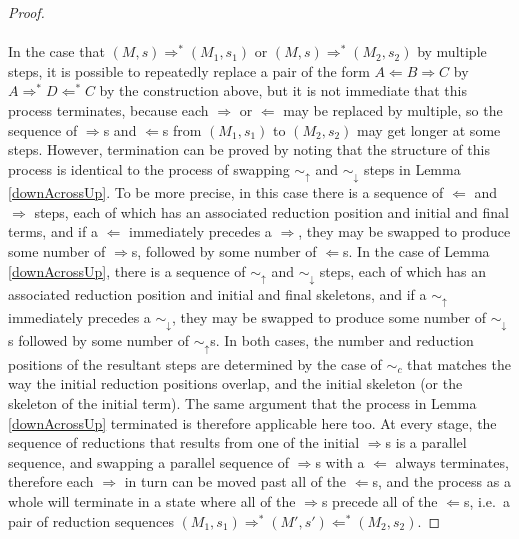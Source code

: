 \begin{proof}
\paragraph{}
In the case that $(M,s) \Rightarrow^* (M_1,s_1)$ or $(M,s) \Rightarrow^* (M_2,s_2)$ by multiple steps, it is possible to repeatedly replace a pair of the form $A \Leftarrow B \Rightarrow C$ by $A \Rightarrow^* D \Leftarrow^* C$ by the construction above, but it is not immediate that this process terminates, because each $\Rightarrow$ or $\Leftarrow$ may be replaced by multiple, so the sequence of $\Rightarrow$s and $\Leftarrow$s from $(M_1,s_1)$ to $(M_2,s_2)$ may get longer at some steps. However, termination can be proved by noting that the structure of this process is identical to the process of swapping $\sim_\uparrow$ and $\sim_\downarrow$ steps in Lemma \ref{downAcrossUp}. To be more precise, in this case there is a sequence of $\Leftarrow$ and $\Rightarrow$ steps, each of which has an associated reduction position and initial and final terms, and if a $\Leftarrow$ immediately precedes a $\Rightarrow$, they may be swapped to produce some number of $\Rightarrow$s, followed by some number of $\Leftarrow$s. In the case of Lemma \ref{downAcrossUp}, there is a sequence of $\sim_\uparrow$ and $\sim_\downarrow$ steps, each of which has an associated reduction position and initial and final skeletons, and if a $\sim_\uparrow$ immediately precedes a $\sim_\downarrow$, they may be swapped to produce some number of $\sim_\downarrow$s followed by some number of $\sim_\uparrow$s. In both cases, the number and reduction positions of the resultant steps are determined by the case of $\sim_c$ that matches the way the initial reduction positions overlap, and the initial skeleton (or the skeleton of the initial term). The same argument that the process in Lemma \ref{downAcrossUp} terminated is therefore applicable here too. At every stage, the sequence of reductions that results from one of the initial $\Rightarrow$s is a parallel sequence, and swapping a parallel sequence of $\Rightarrow$s with a $\Leftarrow$ always terminates, therefore each $\Rightarrow$ in turn can be moved past all of the $\Leftarrow$s, and the process as a whole will terminate in a state where all of the $\Rightarrow$s precede all of the $\Leftarrow$s, i.e.~a pair of reduction sequences $(M_1,s_1) \Rightarrow^* (M',s') \Leftarrow^* (M_2,s_2)$.
\end{proof}

